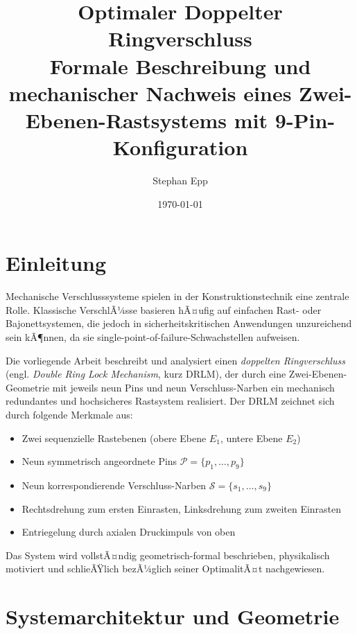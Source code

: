 ﻿\documentclass[12pt, a4paper]{article}
\title{\textbf{Optimaler Doppelter Ringverschluss}\\
\large Formale Beschreibung und mechanischer Nachweis  eines Zwei-Ebenen-Rastsystems mit 9-Pin-Konfiguration}
\author{Stephan Epp}
\date{\today}
\theoremstyle{remark}
\newcommand{\Pin}{\mathcal{P}}
\newcommand{\Scar}{\mathcal{S}}
\begin{document}
\maketitle
\tableofcontents
\newpage

\section{Einleitung}

Mechanische Verschlusssysteme spielen in der Konstruktionstechnik eine zentrale Rolle.
Klassische VerschlÃ¼sse basieren hÃ¤ufig auf einfachen Rast- oder Bajonettsystemen, die
jedoch in sicherheitskritischen Anwendungen unzureichend sein kÃ¶nnen, da sie
single-point-of-failure-Schwachstellen aufweisen.

Die vorliegende Arbeit beschreibt und analysiert einen \emph{doppelten Ringverschluss}
(engl. \textit{Double Ring Lock Mechanism}, kurz DRLM), der durch eine Zwei-Ebenen-Geometrie
mit jeweils neun Pins und neun Verschluss-Narben ein mechanisch redundantes und
hochsicheres Rastsystem realisiert. Der DRLM zeichnet sich durch folgende Merkmale aus:

\begin{itemize}[noitemsep]
  \item Zwei sequenzielle Rastebenen (obere Ebene $E_1$, untere Ebene $E_2$)
  \item Neun symmetrisch angeordnete Pins $\Pin = \{p_1, \ldots, p_9\}$
  \item Neun korrespondierende Verschluss-Narben $\Scar = \{s_1, \ldots, s_9\}$
  \item Rechtsdrehung zum ersten Einrasten, Linksdrehung zum zweiten Einrasten
  \item Entriegelung durch axialen Druckimpuls von oben
\end{itemize}

Das System wird vollstÃ¤ndig geometrisch-formal beschrieben, physikalisch motiviert und
schlieÃŸlich bezÃ¼glich seiner OptimalitÃ¤t nachgewiesen.

\section{Systemarchitektur und Geometrie}
\end{document}
